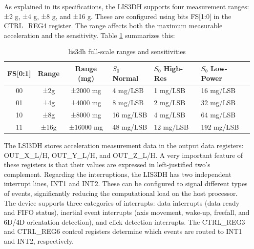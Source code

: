 As explained in its specifications, the LIS3DH supports four measurement ranges: 
±2 g, ±4 g, ±8 g, and ±16 g. These are configured using bits FS[1:0] in the 
CTRL\_REG4 register. The range affects both the maximum measurable acceleration 
and the sensitivity. Table \ref{tab:lis3dh_fs} summarizes this:

\begin{table}[H]
    \centering
    \begin{tabular}{|c|c|c|l|l|l|}
        \hline
        \textbf{FS[0:1]} & \textbf{Range} & \textbf{Range (mg)}
            & \textbf{$S_{0}$ Normal} & \textbf{$S_{0}$ High-Res} & \textbf{$S_{0}$ Low-Power} \\
        \hline
        00  &   ±2g     & ±2000 mg      & 4 mg/LSB      & 1 mg/LSB      &  16 mg/LSB\\
        01  &   ±4g     & ±4000 mg      & 8 mg/LSB      & 2 mg/LSB      &  32 mg/LSB\\
        10  &   ±8g     & ±8000 mg      & 16 mg/LSB     & 4 mg/LSB      &  64 mg/LSB\\
        11  &   ±16g    & ±16000 mg     & 48 mg/LSB     & 12 mg/LSB     &  192 mg/LSB\\
        \hline
    \end{tabular} 
    \caption{lis3dh full-scale ranges and sensitivities}
    \label{tab:lis3dh_fs}
\end{table}

The LSI3DH stores acceleration measurement data in the output data registers: 
OUT\_X\_L/H, OUT\_Y\_L/H, and OUT\_Z\_L/H. A very important feature of these 
registers is that their values are expressed in left-justified two's complement. Regarding 
the interruptions, the LIS3DH has two independent interrupt lines, INT1 and INT2. These can 
be configured to signal different types of events, significantly reducing the 
computational load on the host processor. The device supports three categories of 
interrupts: data interrupts (data ready and FIFO status), inertial event interrupts (axis 
movement, wake-up, freefall, and 6D/4D orientation detection), and click detection 
interrupts. The CTRL\_REG3 and CTRL\_REG6 control registers determine which 
events are routed to INT1 and INT2, respectively.